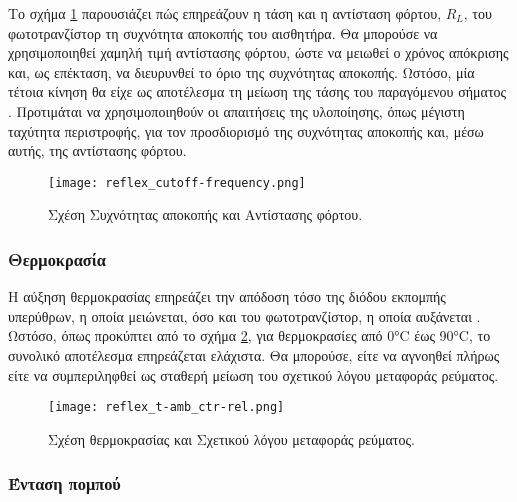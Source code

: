 Το σχήμα \ref{fig:reflex:cutoff-frequency} παρουσιάζει πώς επηρεάζουν η τάση και
η αντίσταση φόρτου, $R_L$, του φωτοτρανζίστορ τη συχνότητα αποκοπής του
αισθητήρα.
Θα μπορούσε να χρησιμοποιηθεί χαμηλή τιμή αντίστασης φόρτου, ώστε να
μειωθεί ο χρόνος απόκρισης και, ως επέκταση, να διευρυνθεί το όριο της
συχνότητας αποκοπής. Ωστόσο, μία τέτοια κίνηση θα είχε ως αποτέλεσμα τη
μείωση της τάσης του παραγόμενου σήματος \parencite{vishay06}.
Προτιμάται να χρησιμοποιηθούν οι απαιτήσεις της υλοποίησης, όπως μέγιστη
ταχύτητα περιστροφής, για τον προσδιορισμό της συχνότητας αποκοπής και, μέσω
αυτής, της αντίστασης φόρτου.

\begin{figure}
    \caption{Σχέση Συχνότητας αποκοπής και Αντίστασης φόρτου.
    \label{fig:reflex:cutoff-frequency}}
    \begin{center}%
    \texttt{[image: reflex\_cutoff-frequency.png]}
    \end{center}

\end{figure}


\subsubsection{Θερμοκρασία}
Η αύξηση θερμοκρασίας επηρεάζει την απόδοση τόσο της διόδου εκπομπής υπερύθρων,
η οποία μειώνεται, όσο και του φωτοτρανζίστορ, η οποία αυξάνεται
\parencite{vishay06}. Ωστόσο, όπως προκύπτει από το σχήμα
\ref{fig:reflex:t-amb_ctr-rel}, για θερμοκρασίες από 0°C έως 90°C, το
συνολικό αποτέλεσμα επηρεάζεται ελάχιστα. Θα μπορούσε, είτε να αγνοηθεί
πλήρως είτε να συμπεριληφθεί ως σταθερή μείωση του σχετικού λόγου μεταφοράς
ρεύματος.

\begin{figure}
    \caption{Σχέση θερμοκρασίας και Σχετικού λόγου μεταφοράς ρεύματος.
    \label{fig:reflex:t-amb_ctr-rel}}
    \begin{center}%
    \texttt{[image: reflex\_t-amb\_ctr-rel.png]}
    \end{center}

\end{figure}


\subsubsection{Ένταση πομπού}

